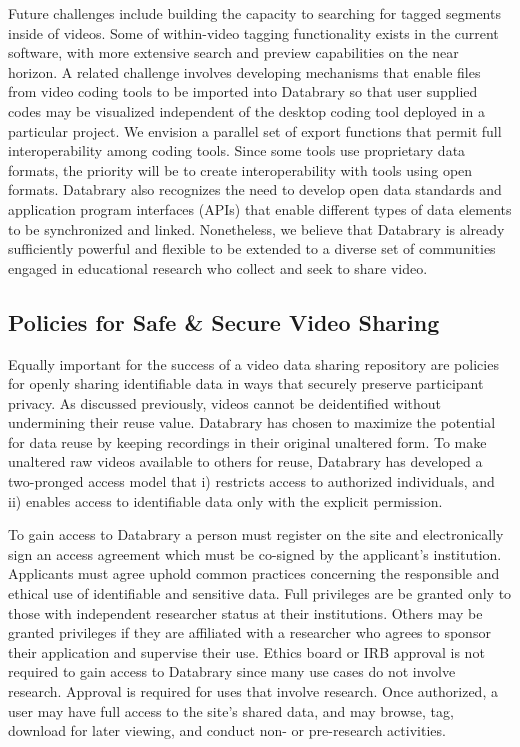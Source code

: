 \documentclass[letterpaper,man,apacite]{apa6}
\begin{document}
Future challenges include building the capacity to searching for tagged segments inside of videos.
Some of within-video tagging functionality exists in the current software, with more extensive search and preview capabilities on the near horizon.
A related challenge involves developing mechanisms that enable files from video coding tools to be imported into Databrary so that user supplied codes may be visualized independent of the desktop coding tool deployed in a particular project.
We envision a parallel set of export functions that permit full interoperability among coding tools.
Since some tools use proprietary data formats, the priority will be to create interoperability with tools using open formats.
Databrary also recognizes the need to develop open data standards and application program interfaces (APIs) that enable different types of data elements to be synchronized and linked.
Nonetheless, we believe that Databrary is already sufficiently powerful and flexible to be extended to a diverse set of communities engaged in educational research who collect and seek to share video.

\subsection{Policies for Safe \& Secure Video Sharing}

Equally important for the success of a video data sharing repository are policies for openly sharing identifiable data in ways that securely preserve participant privacy.
As discussed previously, videos cannot be deidentified without undermining their reuse value.
Databrary has chosen to maximize the potential for data reuse by keeping recordings in their original
unaltered form.
To make unaltered raw videos available to others for reuse, Databrary has developed a two-pronged access model that i) restricts access to authorized individuals, and ii) enables access to identifiable data only with the explicit permission.

To gain access to Databrary a person must register on the site and electronically sign an access agreement which must be co-signed by the applicant's institution. 
Applicants must agree uphold common practices concerning the responsible and ethical use of identifiable and sensitive data. 
Full privileges are be granted only to those with independent researcher status at their institutions. 
Others may be granted privileges if they are affiliated with a researcher who agrees to sponsor their application and supervise their use.
Ethics board or IRB approval is not required to gain access to Databrary since many use cases do not involve research.
Approval is required for uses that involve research.
Once authorized, a user may have full access to the site's shared data, and may browse, tag, download for later viewing, and conduct non- or pre-research activities. 
\end{document}
